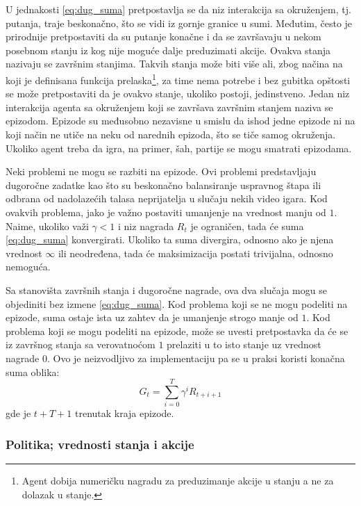 U jednakosti \eqref{eq:dug_suma} pretpostavlja se da niz interakcija sa okruženjem, tj. putanja, traje beskonačno, što se vidi iz gornje granice u sumi. Međutim, često je prirodnije pretpostaviti da su putanje konačne i da se završavaju u nekom posebnom stanju iz kog nije moguće dalje preduzimati akcije. Ovakva stanja nazivaju se završnim stanjima. Takvih stanja može biti više ali, zbog načina na koji je definisana funkcija prelaska\footnote{Agent dobija numeričku nagradu za preduzimanje akcije u stanju a ne za dolazak u stanje.}, za time nema potrebe i bez gubitka opštosti se može pretpostaviti da je ovakvo stanje, ukoliko postoji, jedinstveno. Jedan niz interakcija agenta sa okruženjem koji se završava završnim stanjem naziva se epizodom. Epizode su međusobno nezavisne u smislu da ishod jedne epizode ni na koji način ne utiče na neku od narednih epizoda, što se tiče samog okruženja. Ukoliko agent treba da igra, na primer, šah, partije se mogu smatrati epizodama. 
\par 
Neki problemi ne mogu se razbiti na epizode. Ovi problemi predstavljaju dugoročne zadatke kao što su beskonačno balansiranje uspravnog štapa ili odbrana od nadolazećih talasa neprijatelja u slučaju nekih video igara. Kod ovakvih problema, jako je važno postaviti umanjenje na vrednost manju od $1$. Naime, ukoliko važi $\gamma < 1$ i niz nagrada $R_t$ je ograničen, tada će suma \eqref{eq:dug_suma} konvergirati. Ukoliko ta suma divergira, odnosno ako je njena vrednost $\infty$ ili neodređena, tada će maksimizacija postati trivijalna, odnosno nemoguća.
\par 
Sa stanovišta završnih stanja i dugoročne nagrade, ova dva slučaja mogu se objediniti bez izmene \eqref{eq:dug_suma}. Kod problema koji se ne mogu podeliti na epizode, suma ostaje ista uz zahtev da je umanjenje strogo manje od $1$. Kod problema koji se mogu podeliti na epizode, može se uvesti pretpostavka da će se iz završnog stanja sa verovatnoćom $1$ prelaziti u to isto stanje uz vrednost nagrade $0$. Ovo je neizvodljivo za implementaciju pa se u praksi koristi konačna suma oblika:
\begin{equation}
	G_t = \sum_{i=0}^{T} \gamma^iR_{t+i+1}
\end{equation}
gde je $t+T+1$ trenutak kraja epizode. 

\subsubsection{Politika; vrednosti stanja i akcije}

